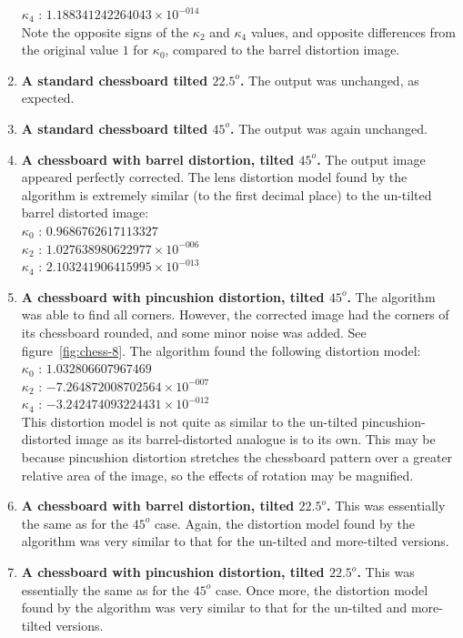 \begin{enumerate}
   $ \kappa_{4}$ : $1.188341242264043 \times 10^{-014}$\\
   Note the opposite signs of the $\kappa_{2}$ and $\kappa_{4}$ values, and opposite differences from the original value $1$ for $\kappa_{0}$, compared to the barrel distortion image.
  \item \textbf{A standard chessboard tilted $22.5^o$.} The output was unchanged, as expected.
  \item \textbf{A standard chessboard tilted $45^o$.} The output was again unchanged.
  \item \textbf{A chessboard with barrel distortion, tilted $45^o$.} The output image appeared perfectly corrected. The lens distortion model found by the algorithm is extremely similar (to the first decimal place) to the un-tilted barrel distorted image:\\
   $ \kappa_{0}$ : $0.9686762617113327$\\
   $ \kappa_{2}$ : $1.027638980622977 \times 10^{-006}$\\
   $ \kappa_{4}$ : $2.103241906415995 \times 10^{-013}$
  \item \textbf{A chessboard with pincushion distortion, tilted $45^o$.} The algorithm was able to find all corners. However, the corrected image had the corners of its chessboard rounded, and some minor noise was added. See figure~\ref{fig:chess-8}. The algorithm found the following distortion model:\\
   $ \kappa_{0}$ : $1.032806607967469$\\
   $ \kappa_{2}$ : $-7.264872008702564 \times 10^{-007}$\\
   $ \kappa_{4}$ : $-3.242474093224431 \times 10^{-012}$\\
   This distortion model is not quite as similar to the un-tilted pincushion-distorted image as its barrel-distorted analogue is to its own. This may be because pincushion distortion stretches the chessboard pattern over a greater relative area of the image, so the effects of rotation may be magnified.
  \item \textbf{A chessboard with barrel distortion, tilted $22.5^o$.} This was essentially the same as for the $45^o$ case. Again, the distortion model found by the algorithm was very similar to that for the un-tilted and more-tilted versions.
  \item \textbf{A chessboard with pincushion distortion, tilted $22.5^o$.} This was essentially the same as for the $45^o$ case. Once more, the distortion model found by the algorithm was very similar to that for the un-tilted and more-tilted versions.

\end{enumerate}
